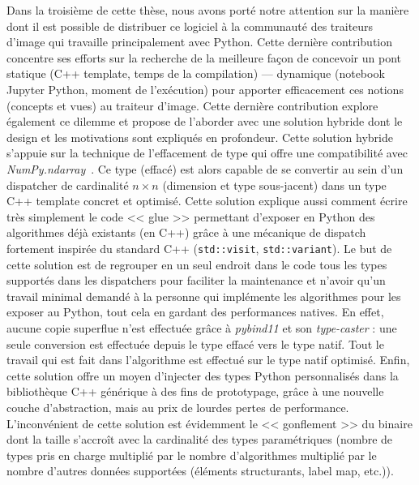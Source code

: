 Dans la troisième de cette thèse, nous avons porté notre attention sur la manière dont il est possible de distribuer ce
logiciel à la communauté des traiteurs d'image qui travaille principalement avec Python. Cette dernière contribution
concentre ses efforts sur la recherche de la meilleure façon de concevoir un pont statique (C++ template, temps de la
compilation) --- dynamique (notebook Jupyter Python, moment de l'exécution) pour apporter efficacement ces notions
(concepts et vues) au traiteur d'image. Cette dernière contribution explore également ce dilemme et propose de l'aborder
avec une solution hybride dont le design et les motivations sont expliqués en profondeur. Cette solution hybride
s'appuie sur la technique de l'effacement de type qui offre une compatibilité avec
\emph{NumPy.ndarray}~\parencite{harris.2020.numpy}. Ce type (effacé) est alors capable de se convertir au sein d'un
dispatcher de cardinalité \(n \times n\) (dimension et type sous-jacent) dans un type C++ template concret et optimisé.
Cette solution explique aussi comment écrire très simplement le code << glue >> permettant d'exposer en Python des
algorithmes déjà existants (en C++) grâce à une mécanique de dispatch fortement inspirée du standard C++
(\texttt{std::visit}, \texttt{std::variant}). Le but de cette solution est de regrouper en un seul endroit dans le code
tous les types supportés dans les dispatchers pour faciliter la maintenance et n'avoir qu'un travail minimal demandé à
la personne qui implémente les algorithmes pour les exposer au Python, tout cela en gardant des performances natives. En
effet, aucune copie superflue n'est effectuée grâce à \emph{pybind11} et son \emph{type-caster} : une seule conversion
est effectuée depuis le type effacé vers le type natif. Tout le travail qui est fait dans l'algorithme est effectué sur
le type natif optimisé. Enfin, cette solution offre un moyen d'injecter des types Python personnalis\'{e}s dans la
bibliothèque C++ générique à des fins de prototypage, grâce à une nouvelle couche d'abstraction, mais au prix de lourdes
pertes de performance. L'inconvénient de cette solution est évidemment le << gonflement >> du binaire dont la taille
s'accroît avec la cardinalité des types paramétriques (nombre de types pris en charge multiplié par le nombre
d'algorithmes multiplié par le nombre d'autres données supportées (éléments structurants, label map, etc.)).

